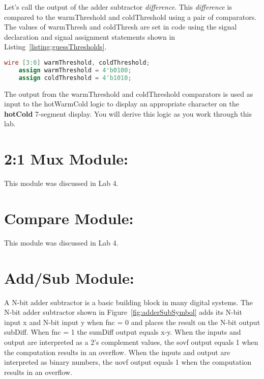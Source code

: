 Let's call the output of the adder subtractor \emph{difference}. This
\emph{difference} is compared to the warmThreshold and coldThreshold
using a pair of comparators. The values of warmThresh and coldThresh are
set in code using the signal declaration and signal assignment
statements shown in Listing~\ref{listing:guessThresholds}.

\begin{lstlisting}[language=Verilog,
 caption={The signal declaration and assignment for guess thresholds.},
 label={listing:guessThresholds},
 frame=single]
    wire [3:0] warmThreshold, coldThreshold; 
    assign warmThreshold = 4'b0100;		
    assign coldThreshold = 4'b1010;
\end{lstlisting}

The output from the warmThreshold and coldThreshold comparators is used
as input to the hotWarmCold logic to display an appropriate character on
the \textbf{hotCold} 7-segment display. You will derive this logic as
you work through this lab.

\hypertarget{mux-module}{%
\section{2:1 Mux Module:}\label{section:hiLowMux-module}}
This module was discussed in Lab 4.


\hypertarget{compare-module}{%
\section{Compare Module:}\label{section:hiLowCompare-module}}
This module was discussed in Lab 4.

\hypertarget{addsub-module}{%
\section{Add/Sub Module:}\label{addsub-module}}

A N-bit adder subtractor is a basic building block in many digital
systems. The N-bit adder subtractor shown in Figure~\ref{fig:adderSubSymbol} adds 
its N-bit
input x and N-bit input y when fnc = 0 and places the result on the
N-bit output subDiff. When fnc = 1 the sumDiff output equals x-y. When
the inputs and output are interpreted as a 2's complement values, the
sovf output equals 1 when the computation results in an overflow. When
the inputs and output are interpreted as binary numbers, the uovf output
equals 1 when the computation results in an overflow.


